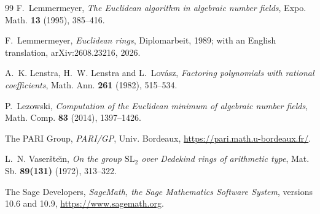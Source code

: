 \documentclass[11pt]{amsart}
\theoremstyle{definition}
\theoremstyle{remark}
\numberwithin{equation}{section}
\begin{document}
\begin{thebibliography}{99}
F.~Lemmermeyer, \emph{The Euclidean algorithm in algebraic number fields}, Expo. Math.
\textbf{13} (1995), 385--416.

F.~Lemmermeyer, \emph{Euclidean rings}, Diplomarbeit, 1989; with an English
translation, arXiv:2608.23216, 2026.

A.~K. Lenstra, H.~W. Lenstra and L.~Lov\'asz, \emph{Factoring polynomials with rational
coefficients}, Math. Ann. \textbf{261} (1982), 515--534.

P.~Lezowski, \emph{Computation of the Euclidean minimum of algebraic number fields}, Math. Comp.
\textbf{83} (2014), 1397--1426.

The PARI Group, \emph{PARI/GP}, Univ. Bordeaux, \url{https://pari.math.u-bordeaux.fr/}.

L.~N. Vaser\v{s}te\u{\i}n, \emph{On the group $\mathrm{SL}_2$ over Dedekind rings of arithmetic
type}, Mat. Sb. \textbf{89(131)} (1972), 313--322.

The Sage Developers, \emph{SageMath, the Sage Mathematics Software System}, versions 10.6 and
10.9, \url{https://www.sagemath.org}.

\end{thebibliography}
\end{document}
